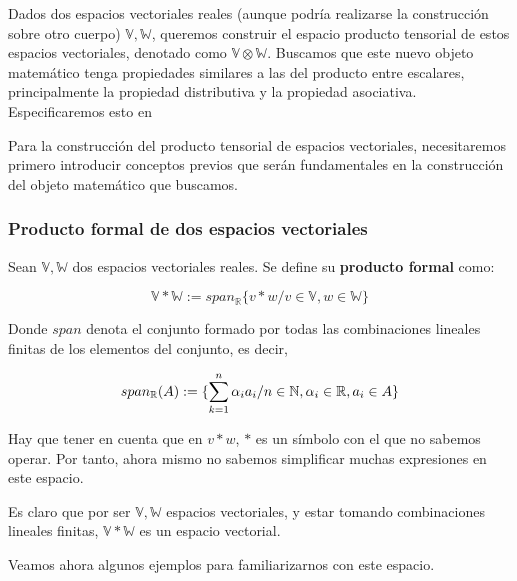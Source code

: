Dados dos espacios vectoriales reales (aunque podría realizarse la construcción sobre otro cuerpo) $\mathbb{V}, \mathbb{W}$, queremos construir el espacio producto tensorial de estos espacios vectoriales, denotado como $\mathbb{V} \otimes \mathbb{W}$. Buscamos que este nuevo objeto matemático tenga propiedades similares a las del producto entre escalares, principalmente la propiedad distributiva y la propiedad asociativa. Especificaremos esto en 

Para la construcción del producto tensorial de espacios vectoriales, necesitaremos primero introducir conceptos previos que serán fundamentales en la construcción del objeto matemático que buscamos.

\subsubsection{Producto formal de dos espacios vectoriales}

\begin{definicion}
    Sean $\mathbb{V}, \mathbb{W}$ dos espacios vectoriales reales. Se define su \textbf{producto formal} como:

    \begin{equation}
        \mathbb{V} \ast \mathbb{W} := span_{\mathbb{R}} \{v \ast w / v \in \mathbb{V}, w \in \mathbb{W} \}
    \end{equation}

    Donde $span$ denota el conjunto formado por todas las combinaciones lineales finitas de los elementos del conjunto, es decir,

    \begin{equation}
        span_{\mathbb{R}}(A) := \{ \sum_{k = 1}^n \alpha_i a_i / n \in \mathbb{N}, \alpha_i \in \mathbb{R}, a_i \in A \}
    \end{equation}

    Hay que tener en cuenta que en $v \ast w$, $\ast$ es un símbolo con el que no sabemos operar. Por tanto, ahora mismo no sabemos simplificar muchas expresiones en este espacio.
\end{definicion}

Es claro que por ser $\mathbb{V}, \mathbb{W}$ espacios vectoriales, y estar tomando combinaciones lineales finitas, $\mathbb{V} \ast \mathbb{W}$ es un espacio vectorial.

Veamos ahora algunos ejemplos para familiarizarnos con este espacio.

